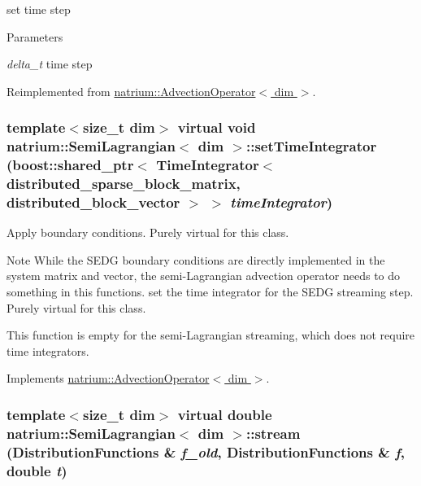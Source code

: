 set time step 
\begin{DoxyParams}{Parameters}
\item[{\em delta\_\-t}]time step \end{DoxyParams}


Reimplemented from \hyperlink{classnatrium_1_1AdvectionOperator_a640db5be4d4930198124fa57752167e5}{natrium::AdvectionOperator$<$ dim $>$}.\hypertarget{classnatrium_1_1SemiLagrangian_ac11ac59a28176a74e94fde81362ce7b5}{
\subsubsection[{setTimeIntegrator}]{\setlength{\rightskip}{0pt plus 5cm}template$<$size\_\-t dim$>$ virtual void {\bf natrium::SemiLagrangian}$<$ dim $>$::setTimeIntegrator (boost::shared\_\-ptr$<$ {\bf TimeIntegrator}$<$ distributed\_\-sparse\_\-block\_\-matrix, distributed\_\-block\_\-vector $>$ $>$ {\em timeIntegrator})}}
\label{classnatrium_1_1SemiLagrangian_ac11ac59a28176a74e94fde81362ce7b5}


Apply boundary conditions. Purely virtual for this class. \begin{DoxyNote}{Note}
While the SEDG boundary conditions are directly implemented in the system matrix and vector, the semi-\/Lagrangian advection operator needs to do something in this functions. set the time integrator for the SEDG streaming step. Purely virtual for this class. 

This function is empty for the semi-\/Lagrangian streaming, which does not require time integrators. 
\end{DoxyNote}


Implements \hyperlink{classnatrium_1_1AdvectionOperator_aa93f60c7e7270a35df21387a962d7a38}{natrium::AdvectionOperator$<$ dim $>$}.\hypertarget{classnatrium_1_1SemiLagrangian_a03956c49c0bd288340b734f2fa9aad3c}{
\subsubsection[{stream}]{\setlength{\rightskip}{0pt plus 5cm}template$<$size\_\-t dim$>$ virtual double {\bf natrium::SemiLagrangian}$<$ dim $>$::stream ({\bf DistributionFunctions} \& {\em f\_\-old}, \/  {\bf DistributionFunctions} \& {\em f}, \/  double {\em t})}}
\label{classnatrium_1_1SemiLagrangian_a03956c49c0bd288340b734f2fa9aad3c}


